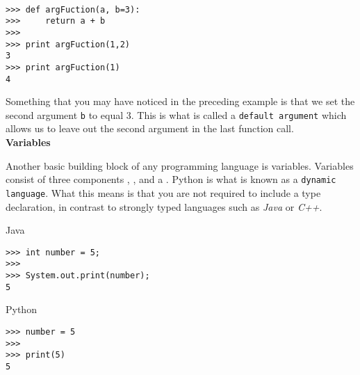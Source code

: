 \documentclass[letterpaper,11pt]{article}
\begin{document}
\\
\begin{minipage}{.5\textwidth}
    \begin{tcolorbox}
        \begin{footnotesize}
            \begin{verbatim}
>>> def argFuction(a, b=3):
>>>     return a + b   
>>>
>>> print argFuction(1,2)
3
>>> print argFuction(1)
4
            \end{verbatim}
        \end{footnotesize}
    \end{tcolorbox}
\end{minipage}
\par{Something that you may have noticed in the preceding example is that we set
the second argument \texttt{b} to equal 3. This is what is called a
\texttt{default argument} which allows us to leave out the second argument in
the last function call.}
\\
\textbf{Variables}
\par{Another basic building block of any programming language is variables.
    Variables consist of three components , ,
    and a . Python is what is known as a \texttt{dynamic
    language}. What this means is that you are not required to include a type
declaration, in contrast to strongly typed languages such as \textit{Java} or
\textit{C++}.}
\\ 
%
\begin{minipage}{.5\textwidth}
    Java
    \begin{tcolorbox}
        \begin{footnotesize}
            \begin{verbatim}
>>> int number = 5;
>>>
>>> System.out.print(number);
5
            \end{verbatim}
        \end{footnotesize}
    \end{tcolorbox}
\end{minipage}
%
\begin{minipage}{.5\textwidth}
    Python
    \begin{tcolorbox}
        \begin{footnotesize}
            \begin{verbatim}
>>> number = 5
>>>
>>> print(5)
5
            \end{verbatim}
        \end{footnotesize}
    \end{tcolorbox}
\end{minipage}
\end{document}
